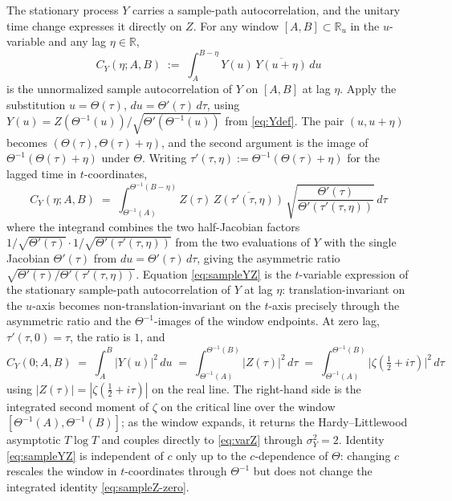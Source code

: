 \documentclass[11pt]{article}
\begin{document}
The stationary process $Y$ carries a sample-path autocorrelation, and the unitary time change expresses it directly on $Z$. For any window $[A,B]\subset\mathbb{R}_u$ in the $u$-variable and any lag $\eta\in\mathbb{R}$,
\begin{equation}\label{eq:CYdef}
C_Y(\eta;A,B) \;:=\; \int_{A}^{B-\eta}Y(u)\,\overline{Y(u+\eta)}\,du
\end{equation}
is the unnormalized sample autocorrelation of $Y$ on $[A,B]$ at lag $\eta$. Apply the substitution $u=\Theta(\tau)$, $du=\Theta'(\tau)\,d\tau$, using $Y(u)=Z(\Theta^{-1}(u))/\sqrt{\Theta'(\Theta^{-1}(u))}$ from \eqref{eq:Ydef}. The pair $(u,u+\eta)$ becomes $(\Theta(\tau),\Theta(\tau)+\eta)$, and the second argument is the image of $\Theta^{-1}(\Theta(\tau)+\eta)$ under $\Theta$. Writing $\tau'(\tau,\eta) := \Theta^{-1}(\Theta(\tau)+\eta)$ for the lagged time in $t$-coordinates,
\begin{equation}\label{eq:sampleYZ}
C_Y(\eta;A,B) \;=\; \int_{\Theta^{-1}(A)}^{\Theta^{-1}(B-\eta)} Z(\tau)\,\overline{Z(\tau'(\tau,\eta))}\,\sqrt{\frac{\Theta'(\tau)}{\Theta'(\tau'(\tau,\eta))}}\,d\tau
\end{equation}
where the integrand combines the two half-Jacobian factors $1/\sqrt{\Theta'(\tau)}\cdot 1/\sqrt{\Theta'(\tau'(\tau,\eta))}$ from the two evaluations of $Y$ with the single Jacobian $\Theta'(\tau)$ from $du=\Theta'(\tau)\,d\tau$, giving the asymmetric ratio $\sqrt{\Theta'(\tau)/\Theta'(\tau'(\tau,\eta))}$. Equation \eqref{eq:sampleYZ} is the $t$-variable expression of the stationary sample-path autocorrelation of $Y$ at lag $\eta$: translation-invariant on the $u$-axis becomes non-translation-invariant on the $t$-axis precisely through the asymmetric ratio and the $\Theta^{-1}$-images of the window endpoints. At zero lag, $\tau'(\tau,0)=\tau$, the ratio is $1$, and
\begin{equation}\label{eq:sampleZ-zero}
C_Y(0;A,B) \;=\; \int_{A}^{B}|Y(u)|^{2}\,du \;=\; \int_{\Theta^{-1}(A)}^{\Theta^{-1}(B)}|Z(\tau)|^{2}\,d\tau \;=\; \int_{\Theta^{-1}(A)}^{\Theta^{-1}(B)}\bigl|\zeta(\tfrac{1}{2}+i\tau)\bigr|^{2}\,d\tau
\end{equation}
using $|Z(\tau)|=|\zeta(\tfrac{1}{2}+i\tau)|$ on the real line. The right-hand side is the integrated second moment of $\zeta$ on the critical line over the window $[\Theta^{-1}(A),\Theta^{-1}(B)]$; as the window expands, it returns the Hardy--Littlewood asymptotic $T\log T$ and couples directly to \eqref{eq:varZ} through $\sigma_Y^2 = 2$. Identity \eqref{eq:sampleYZ} is independent of $c$ only up to the $c$-dependence of $\Theta$: changing $c$ rescales the window in $t$-coordinates through $\Theta^{-1}$ but does not change the integrated identity \eqref{eq:sampleZ-zero}.
\end{document}
